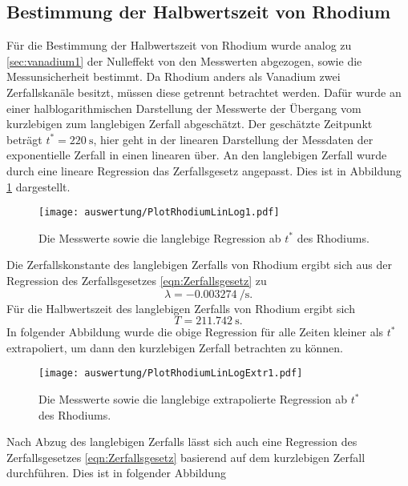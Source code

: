 \subsection{Bestimmung der Halbwertszeit von Rhodium}
  Für die Bestimmung der Halbwertszeit von Rhodium wurde analog zu \ref{sec:vanadium1} der Nulleffekt von den Messwerten abgezogen, sowie die Messunsicherheit bestimmt. Da Rhodium anders als Vanadium
  zwei Zerfallskanäle besitzt, müssen diese getrennt betrachtet werden. Dafür wurde an einer halblogarithmischen Darstellung der Messwerte der Übergang vom kurzlebigen zum langlebigen Zerfall
  abgeschätzt. Der geschätzte Zeitpunkt beträgt $t^{*} = \SI{220}{\second}$, hier geht in der linearen Darstellung der Messdaten der exponentielle Zerfall in einen linearen über. An den langlebigen
  Zerfall wurde durch eine lineare Regression das Zerfallsgesetz angepasst. Dies ist in Abbildung \ref{fig:PlotRhodiumLinLog1} dargestellt.
  \begin{figure}[H]
    \centering
    \texttt{[image: auswertung/PlotRhodiumLinLog1.pdf]}
    \caption{Die Messwerte sowie die langlebige Regression ab $t^{*}$ des Rhodiums.}
    \label{fig:PlotRhodiumLinLog1}
  \end{figure}
  \noindent
  Die Zerfallskonstante des langlebigen Zerfalls von Rhodium ergibt sich aus der Regression des Zerfallsgesetzes \ref{eqn:Zerfallsgesetz} zu
  \begin{equation*}
    \lambda = \SI{-0.003274}{\per\second}. %
  \end{equation*}
  Für die Halbwertszeit des langlebigen Zerfalls von Rhodium ergibt sich
  \begin{equation*}
    T = \SI{211.742}{\second}.
  \end{equation*}
  In folgender Abbildung wurde die obige Regression für alle Zeiten kleiner als $t^{*}$ extrapoliert, um dann den kurzlebigen Zerfall betrachten zu können.
  \begin{figure}[H]
    \centering
    \texttt{[image: auswertung/PlotRhodiumLinLogExtr1.pdf]}
    \caption{Die Messwerte sowie die langlebige extrapolierte Regression ab $t^{*}$ des Rhodiums.}
    \label{fig:PlotRhodiumLinLogExtr1}
  \end{figure}
  \noindent
  Nach Abzug des langlebigen Zerfalls lässt sich auch eine Regression des Zerfallsgesetzes \ref{eqn:Zerfallsgesetz} basierend auf dem kurzlebigen Zerfall durchführen. Dies ist in folgender Abbildung
